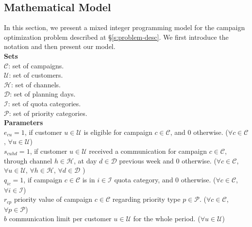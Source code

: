 \documentclass[11pt]{article}
\begin{document}
\subsection{Mathematical Model} \label{s:problem-math}

In this section, we present a mixed integer programming model for the campaign optimization problem described at \S \ref{s:problem-desc}. We first introduce the notation and then present our model.\\

\noindent \textbf{Sets}\\
${\mathcal{C}}$: set of campaigns. \\
${\mathcal{U}}$: set of customers. \\
${\mathcal{H}}$: set of channels. \\
${\mathcal{D}}$: set of planning days. \\
${\mathcal{I}}$: set of quota categories. \\
${\mathcal{P}}$: set of priority categories. \\

\noindent \textbf{Parameters}\\

\noindent $e_{{c}{u}}=1$, if customer $u \in \mathcal{U}$ is eligible for campaign $c \in \mathcal{C}$, and 0 otherwise.
($\forall c \in \mathcal{C}$, $\forall u \in \mathcal{U}$)\\

\noindent $s_{{c}{u}{h}{d}}=1$, if customer $u \in \mathcal{U}$ received a communication for campaign $c \in \mathcal{C}$, through channel $h \in \mathcal{H}$, at day $d \in \mathcal{D}$ previous week and 0 otherwise.
($\forall c \in \mathcal{C}$, $\forall u \in \mathcal{U}$, $\forall h \in \mathcal{H}$, $\forall d \in \mathcal{D}$ )\\

\noindent $q_{{i}{c}}=1$, if campaign $c \in \mathcal{C}$ is in $i \in \mathcal{I}$ quota category, and 0 otherwise.
($\forall c \in \mathcal{C}$, $\forall i \in \mathcal{I}$)\\

\noindent $r_{{c}{p}}$ priority value of campaign $c \in \mathcal{C}$ regarding priority type $p \in \mathcal{P}$.
($\forall c \in \mathcal{C}$, $\forall p \in \mathcal{P}$)\\

\noindent $b$ communication limit per customer $u \in \mathcal{U}$ for the whole period.
($\forall u \in \mathcal{U}$)\\
\end{document}

